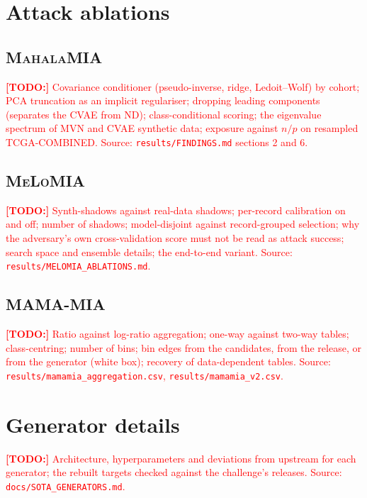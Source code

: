 \documentclass[webpdf,contemporary,large]{oup-authoring-template}
\newif\ifdraft \drafttrue
\newcommand{\annot}[3]{\ifdraft\textcolor{#1}{\textbf{[#2:]} #3}\fi}
\newcommand{\todo}[1]{\annot{red}{TODO}{#1}}
\newcommand{\mahala}{\textsc{MahalaMIA}}
\newcommand{\melo}{\textsc{MeLoMIA}}
\newcommand{\mama}{\textsc{MAMA-MIA}}
\begin{document}



\begin{appendices}

\section{Attack ablations}
\label{app:ablations}

\subsection{\mahala{}}
\label{app:mahala}
\todo{Covariance conditioner (pseudo-inverse, ridge, Ledoit--Wolf) by cohort; PCA truncation as an implicit regulariser; dropping leading components (separates the CVAE from ND); class-conditional scoring; the eigenvalue spectrum of MVN and CVAE synthetic data; exposure against $n/p$ on resampled TCGA-COMBINED. Source: \texttt{results/FINDINGS.md} sections 2 and 6.}

\subsection{\melo{}}
\label{app:melo}
\todo{Synth-shadows against real-data shadows; per-record calibration on and off; number of shadows; model-disjoint against record-grouped selection; why the adversary's own cross-validation score must not be read as attack success; search space and ensemble details; the end-to-end variant. Source: \texttt{results/MELOMIA\_ABLATIONS.md}.}

\subsection{\mama{}}
\label{app:mama}
\todo{Ratio against log-ratio aggregation; one-way against two-way tables; class-centring; number of bins; bin edges from the candidates, from the release, or from the generator (white box); recovery of data-dependent tables. Source: \texttt{results/mamamia\_aggregation.csv}, \texttt{results/mamamia\_v2.csv}.}

\section{Generator details}
\label{app:generators}
\todo{Architecture, hyperparameters and deviations from upstream for each generator; the rebuilt targets checked against the challenge's releases. Source: \texttt{docs/SOTA\_GENERATORS.md}.}


\end{appendices}
\end{document}
